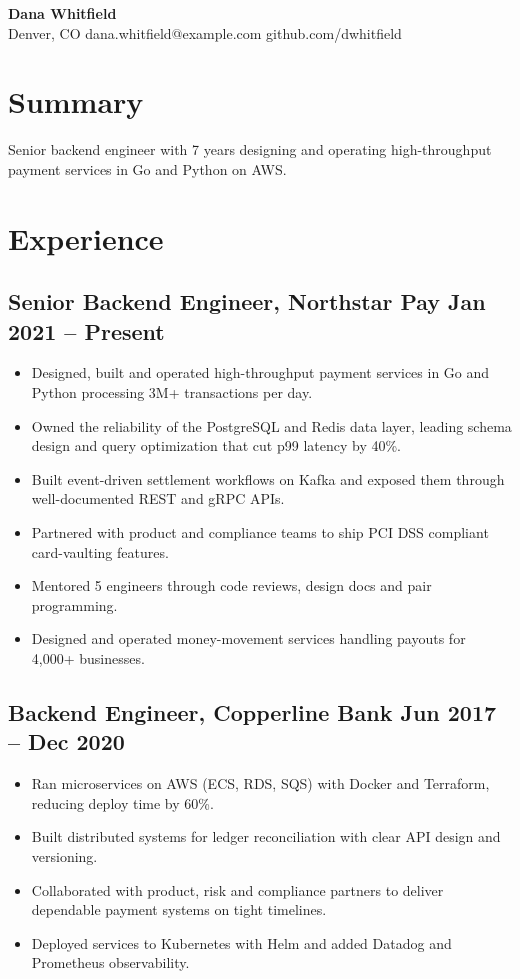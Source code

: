 \documentclass[11pt]{article}
\begin{document}
\begin{center}
  {\LARGE \textbf{Dana Whitfield}}\\
  Denver, CO \textbar{} dana.whitfield@example.com \textbar{} github.com/dwhitfield
\end{center}

\section*{Summary}
Senior backend engineer with 7 years designing and operating high-throughput payment services in Go and Python on AWS.

\section*{Experience}
\subsection*{Senior Backend Engineer, Northstar Pay \hfill Jan 2021 -- Present}
\begin{itemize}
  \item Designed, built and operated high-throughput payment services in Go and Python processing 3M+ transactions per day.
  \item Owned the reliability of the PostgreSQL and Redis data layer, leading schema design and query optimization that cut p99 latency by 40\%.
  \item Built event-driven settlement workflows on Kafka and exposed them through well-documented REST and gRPC APIs.
  \item Partnered with product and compliance teams to ship PCI DSS compliant card-vaulting features.
  \item Mentored 5 engineers through code reviews, design docs and pair programming.
  \item Designed and operated money-movement services handling payouts for 4,000+ businesses.
\end{itemize}

\subsection*{Backend Engineer, Copperline Bank \hfill Jun 2017 -- Dec 2020}
\begin{itemize}
  \item Ran microservices on AWS (ECS, RDS, SQS) with Docker and Terraform, reducing deploy time by 60\%.
  \item Built distributed systems for ledger reconciliation with clear API design and versioning.
  \item Collaborated with product, risk and compliance partners to deliver dependable payment systems on tight timelines.
  \item Deployed services to Kubernetes with Helm and added Datadog and Prometheus observability.
\end{itemize}
\end{document}
